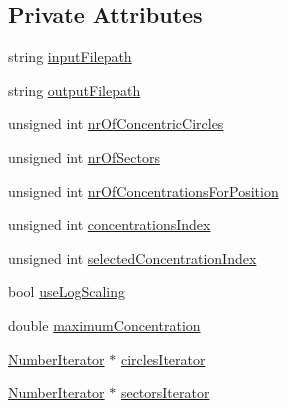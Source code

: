 \subsection*{\-Private \-Attributes}
\begin{DoxyCompactItemize}
\item 
string \hyperlink{classmultiscale_1_1video_1_1PolarCsvToInputFilesConverter_a7b33b6d00b5e0d809f4fb0d76985ab59}{input\-Filepath}
\item 
string \hyperlink{classmultiscale_1_1video_1_1PolarCsvToInputFilesConverter_a1033d31c9bfc7ccad08337c7b0fa6e6e}{output\-Filepath}
\item 
unsigned int \hyperlink{classmultiscale_1_1video_1_1PolarCsvToInputFilesConverter_a7aa37d18880e822369cbe118a093e24f}{nr\-Of\-Concentric\-Circles}
\item 
unsigned int \hyperlink{classmultiscale_1_1video_1_1PolarCsvToInputFilesConverter_a9246a2c9749602af145d5579bde8a9d1}{nr\-Of\-Sectors}
\item 
unsigned int \hyperlink{classmultiscale_1_1video_1_1PolarCsvToInputFilesConverter_a3a9301788514c50c295ca113a4114938}{nr\-Of\-Concentrations\-For\-Position}
\item 
unsigned int \hyperlink{classmultiscale_1_1video_1_1PolarCsvToInputFilesConverter_afd9f17e6ba2dc46b920ab28538278362}{concentrations\-Index}
\item 
unsigned int \hyperlink{classmultiscale_1_1video_1_1PolarCsvToInputFilesConverter_a121d592659f9f5075c8c78aa46c2950c}{selected\-Concentration\-Index}
\item 
bool \hyperlink{classmultiscale_1_1video_1_1PolarCsvToInputFilesConverter_af07bf56fc39bb226a6e2596f35ada0d7}{use\-Log\-Scaling}
\item 
double \hyperlink{classmultiscale_1_1video_1_1PolarCsvToInputFilesConverter_a89b7dce2825cd5c8c45a1e6f19770e5f}{maximum\-Concentration}
\item 
\hyperlink{classmultiscale_1_1NumberIterator}{\-Number\-Iterator} $\ast$ \hyperlink{classmultiscale_1_1video_1_1PolarCsvToInputFilesConverter_ad4cf12c7f3951f0bb388939797cbcc0c}{circles\-Iterator}
\item 
\hyperlink{classmultiscale_1_1NumberIterator}{\-Number\-Iterator} $\ast$ \hyperlink{classmultiscale_1_1video_1_1PolarCsvToInputFilesConverter_aa6895c1613a551cd05195f05ae51862b}{sectors\-Iterator}
\end{DoxyCompactItemize}
